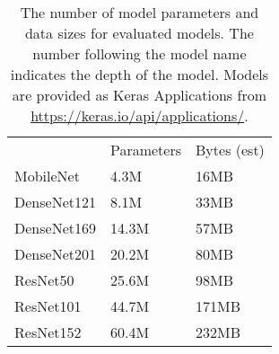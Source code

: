 \begin{table}
    \centering
    \caption{
        The number of model parameters and data sizes for evaluated models.
        The number following the model name indicates the depth of the model.
        Models are provided as Keras Applications from \url{https://keras.io/api/applications/}.
    }
    \begin{tabular}{lll}
    ~           & Parameters & Bytes (est) \\
    MobileNet   & 4.3M       & 16MB      \\
    DenseNet121 & 8.1M       & 33MB      \\
    DenseNet169 & 14.3M      & 57MB      \\
    DenseNet201 & 20.2M      & 80MB      \\
    ResNet50    & 25.6M      & 98MB     \\
    ResNet101   & 44.7M      & 171MB     \\
    ResNet152   & 60.4M      & 232MB     \\
    \end{tabular}
    \label{tbl:hvd_model_chars}
\end{table}